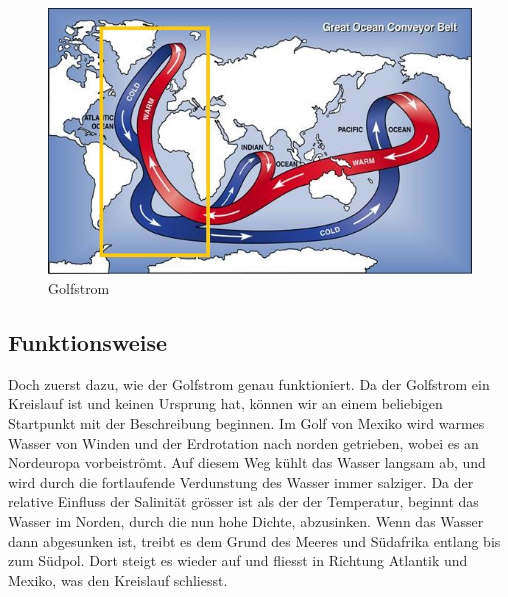 \begin{figure}
	\includegraphics[width=12cm]{thermohalin/Bilder/Deep-Ocean-Currents.jpg}
	\centering
	\caption{Golfstrom}
\end{figure}



\subsection{Funktionsweise}

Doch zuerst dazu, wie der Golfstrom genau funktioniert.
Da der Golfstrom ein Kreislauf ist und keinen Ursprung hat, können wir an einem beliebigen Startpunkt mit der Beschreibung beginnen. Im Golf von Mexiko wird warmes Wasser von Winden und der Erdrotation nach norden getrieben, wobei es an Nordeuropa vorbeiströmt.
Auf diesem Weg kühlt das Wasser langsam ab, und wird durch die fortlaufende Verdunstung des Wasser immer salziger. Da der relative Einfluss der Salinität grösser ist als der der Temperatur, beginnt das Wasser im Norden, durch die nun hohe Dichte, abzusinken. Wenn das Wasser dann abgesunken ist, treibt es dem Grund des Meeres und Südafrika entlang bis zum Südpol. Dort steigt es wieder  auf und fliesst in Richtung Atlantik und Mexiko, was den Kreislauf schliesst.

